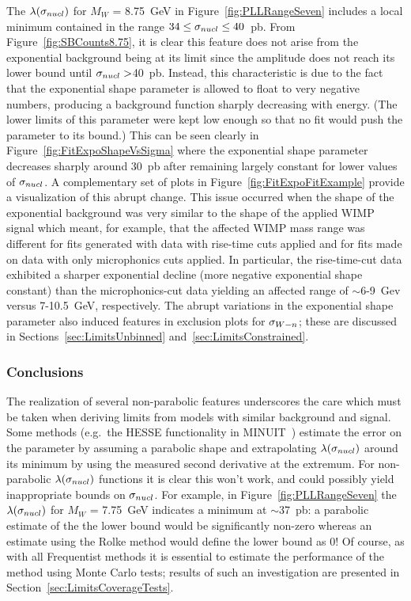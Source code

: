 The $\lambda(\sigma_{nucl})$ for $M_{W}$ = 8.75~GeV in Figure~\ref{fig:PLLRangeSeven} includes a local minimum contained in the range $34\leq\sigma_{nucl}\leq40$~pb.  From Figure~\ref{fig:SBCounts8.75}, it is clear this feature does not arise from the exponential background being at its limit since the amplitude does not reach its lower bound until $\sigma_{nucl}>$40~pb.  Instead, this characteristic is due to the fact that the exponential shape parameter is allowed to float to very negative numbers, producing a background function sharply decreasing with energy.  (The lower limits of this parameter were kept low enough so that no fit would push the parameter to its bound.)  This can be seen clearly in Figure~\ref{fig:FitExpoShapeVsSigma} where the exponential shape parameter decreases sharply around 30~pb after remaining largely constant for lower values of $\sigma_{nucl}$.  A complementary set of plots in Figure~\ref{fig:FitExpoFitExample} provide a visualization of this abrupt change.  This issue occurred when the shape of the exponential background was very similar to the shape of the applied WIMP signal which meant, for example, that the affected WIMP mass range was different for fits generated with data with rise-time cuts applied and for fits made on data with only microphonics cuts applied.  In particular, the rise-time-cut data exhibited a sharper exponential decline (more negative exponential shape constant) than the microphonics-cut data yielding an affected range of $\sim$6-9~Gev versus 7-10.5~GeV, respectively.  The abrupt variations in the exponential shape parameter also induced features in exclusion plots for $\sigma_{W-n}$; these are discussed in Sections~\ref{sec:LimitsUnbinned} and~\ref{sec:LimitsConstrained}.

		\subsubsection{Conclusions}
		\label{sec:LLPathoConclusions}

The realization of several non-parabolic features underscores the care which must be taken when deriving limits from models with similar background and signal.  Some methods (e.g.~the HESSE functionality in MINUIT~\cite{James:1975dr}) estimate the error on the parameter by assuming a parabolic shape and extrapolating $\lambda(\sigma_{nucl})$ around its minimum by using the measured second derivative at the extremum.  For non-parabolic $\lambda(\sigma_{nucl})$ functions it is clear this won't work, and could possibly yield inappropriate bounds on $\sigma_{nucl}$.  For example, in Figure~\ref{fig:PLLRangeSeven} the $\lambda(\sigma_{nucl})$ for $M_{W}$ = 7.75~GeV indicates a minimum at $\sim$37~pb: a parabolic estimate of the the lower bound would be significantly non-zero %
whereas an estimate using the Rolke method would define the lower bound as 0!  Of course, as with all Frequentist methods it is essential to estimate the performance of the method using Monte Carlo tests; results of such an investigation are presented in Section~\ref{sec:LimitsCoverageTests}.

